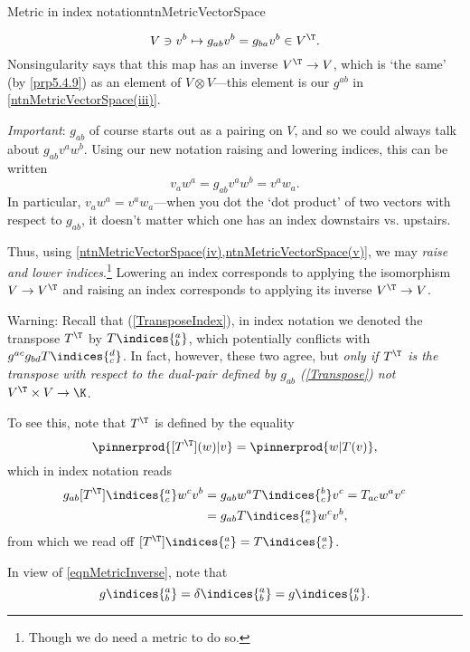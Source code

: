 \begin{ntn}{Metric in index notation}{ntnMetricVectorSpace}
\begin{rmk}
		\begin{equation}
			V\ni v^b\mapsto g_{ab}v^b=g_{ba}v^b\in V^{\T}.
		\end{equation}
		Nonsingularity says that this map has an inverse $V^{\T}\rightarrow V$, which is `the same' (by \cref{prp5.4.9}) as an element of $V\otimes V$---this element is our $g^{ab}$ in \cref{ntnMetricVectorSpace(iii)}.
	\end{rmk}
	\begin{rmk}
		\emph{Important}:  $g_{ab}$ of course starts out as a pairing on $V$, and so we could always talk about $g_{ab}v^aw^b$.  Using our new notation raising and lowering indices, this can be written
		\begin{equation}
			v_aw^a=g_{ab}v^aw^b=v^aw_a.
		\end{equation}
		In particular, $v_aw^a=v^aw_a$---when you dot the `dot product' of two vectors with respect to $g_{ab}$, it doesn't matter which one has an index downstairs vs. upstairs.
	\end{rmk}
	\begin{rmk}
		Thus, using \cref{ntnMetricVectorSpace(iv),ntnMetricVectorSpace(v)}, we may \emph{raise and lower indices}.\footnote{Though we do need a metric to do so.}  Lowering an index corresponds to applying the isomorphism $V\rightarrow V^{\T}$ and raising an index corresponds to applying its inverse $V^{\T}\rightarrow V$.
	\end{rmk}
	\begin{rmk}
		Warning:  Recall that (\cref{TransposeIndex}), in index notation we denoted the transpose $T^{\T}$ by $T\indices{_b^a}$, which potentially conflicts with $g^{ac}g_{bd}T\indices{^d_c}$.  In fact, however, these two agree, but \emph{only if $T^{\T}$ is the transpose with respect to the dual-pair defined by $g_{ab}$ (\cref{Transpose}) not $V^{\T}\times V\rightarrow \K$}.
		
		To see this, note that $T^{\T}$ is defined by the equality
		\begin{equation}
			\pinnerprod{[T^{\T}](w)|v}=\pinnerprod{w|T(v)},
		\end{equation}
		which in index notation reads
		\begin{equation}
			\begin{split}
				g_{ab}[T^{\T}]\indices{^a_c}w^cv^b & =g_{ab}w^aT\indices{^b_c}v^c=T_{ac}w^av^c \\
				& =g_{ab}T\indices{_c^a}w^cv^b,
			\end{split}
		\end{equation}
		from which we read off $[T^{\T}]\indices{^a_c}=T\indices{_c^a}$.
	\end{rmk}
	\begin{rmk}
		In view of \eqref{eqnMetricInverse}, note that
		\begin{equation}
			g\indices{^a_b}=\delta \indices{^a_b}=g\indices{_b^a}.
		\end{equation}
	\end{rmk}
\end{ntn}
